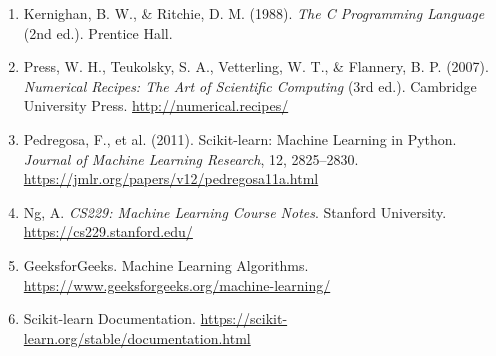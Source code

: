 \documentclass[11pt,a4paper]{article}
\begin{document}
{\begin{enumerate}
\item Kernighan, B. W., \& Ritchie, D. M. (1988). \textit{The C Programming Language} (2nd ed.). Prentice Hall.

\item Press, W. H., Teukolsky, S. A., Vetterling, W. T., \& Flannery, B. P. (2007). \textit{Numerical Recipes: The Art of Scientific Computing} (3rd ed.). Cambridge University Press. \url{http://numerical.recipes/}

\item Pedregosa, F., et al. (2011). Scikit-learn: Machine Learning in Python. \textit{Journal of Machine Learning Research}, 12, 2825--2830. \url{https://jmlr.org/papers/v12/pedregosa11a.html}

\item Ng, A. \textit{CS229: Machine Learning Course Notes}. Stanford University. \url{https://cs229.stanford.edu/}

\item GeeksforGeeks. Machine Learning Algorithms. \url{https://www.geeksforgeeks.org/machine-learning/}

\item Scikit-learn Documentation. \url{https://scikit-learn.org/stable/documentation.html}

\end{enumerate}
}
\end{document}
